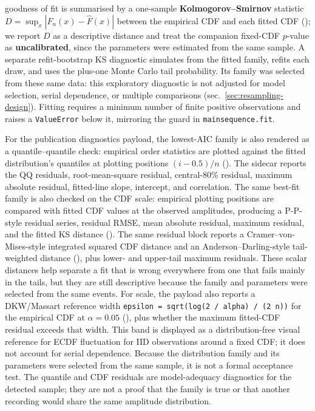 \documentclass[
]{article}
\begin{document}
goodness of fit is summarised by a one-sample
\textbf{Kolmogorov--Smirnov} statistic
\(D = \sup_x |F_n(x) - \hat{F}(x)|\) between the empirical CDF and each
fitted CDF (); we report
\(D\) as a descriptive distance and treat the companion fixed-CDF
\(p\)-value as \textbf{uncalibrated}, since the parameters were
estimated from the same sample. A separate refit-bootstrap KS diagnostic
simulates from the fitted family, refits each draw, and uses the
plus-one Monte Carlo tail probability. Its family was selected from
these same data: this exploratory diagnostic is not adjusted for model
selection, serial dependence, or multiple comparisons
(sec.~\ref{sec:resampling-design}). Fitting requires a minimum number of
finite positive observations and raises a \texttt{ValueError} below it,
mirroring the guard in \texttt{mainsequence.fit}.

For the publication diagnostics payload, the lowest-AIC family is also
rendered as a quantile--quantile check: empirical order statistics are
plotted against the fitted distribution's quantiles at plotting
positions \((i - 0.5)/n\) (). The sidecar reports the QQ residuals,
root-mean-square residual, central-80\% residual, maximum absolute
residual, fitted-line slope, intercept, and correlation. The same
best-fit family is also checked on the CDF scale: empirical plotting
positions are compared with fitted CDF values at the observed
amplitudes, producing a P-P-style residual series, residual RMSE, mean
absolute residual, maximum residual, and the fitted KS distance
(). The same residual
block reports a Cramer--von-Mises-style integrated squared CDF distance
and an Anderson--Darling-style tail-weighted distance
(), plus
lower- and upper-tail maximum residuals. These scalar distances help
separate a fit that is wrong everywhere from one that fails mainly in
the tails, but they are still descriptive because the family and
parameters were selected from the same events. For scale, the payload
also reports a DKW/Massart reference width
\texttt{epsilon\ =\ sqrt(log(2\ /\ alpha)\ /\ (2\ n))} for the empirical
CDF at \(\alpha=0.05\) (),
plus whether the maximum fitted-CDF residual exceeds that width. This
band is displayed as a distribution-free visual reference for ECDF
fluctuation for IID observations around a fixed CDF; it does not account
for serial dependence. Because the distribution family and its
parameters were selected from the same sample, it is not a formal
acceptance test. The quantile and CDF residuals are model-adequacy
diagnostics for the detected sample; they are not a proof that the
family is true or that another recording would share the same amplitude
distribution.
\end{document}
